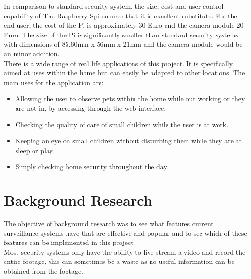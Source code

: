 \documentclass[12pt]{report}
\begin{document}
In comparison to standard security system, the size, cost and user control capability of The Raspberry Spi ensures that it is excellent substitute. For the end user, the cost of the Pi is approximately 30 Euro and the camera module 20 Euro. The size of the Pi is significantly smaller than standard security systems with dimensions of 85.60mm x 56mm x 21mm and the camera module would be an minor addition.\\

There is a wide range of real life applications of this project. It is specifically aimed at uses within the home but can easily be adapted to other locations. The main uses for the application are: \\

\begin{itemize}

   \item Allowing the user to observe pets within the home while out working or they are not in, by accessing through the web interface.\\  
  
  \item Checking the quality of care of small children while the user is at work.\\
  
  \item Keeping an eye on small children without disturbing them while they are at sleep or play.\\ 
  
  \item Simply checking home security throughout the day.\\  
  
\end{itemize}

\section{Background Research}
\label{sec:research}

The objective of background research was to see what features current surveillance systems have that are effective and popular and to see which of these features can be implemented in this project.\\

Most security systems only have the ability to live stream a video and record the entire footage, this can sometimes be a waste as no useful information can be obtained from the footage.\\ 
\end{document}
